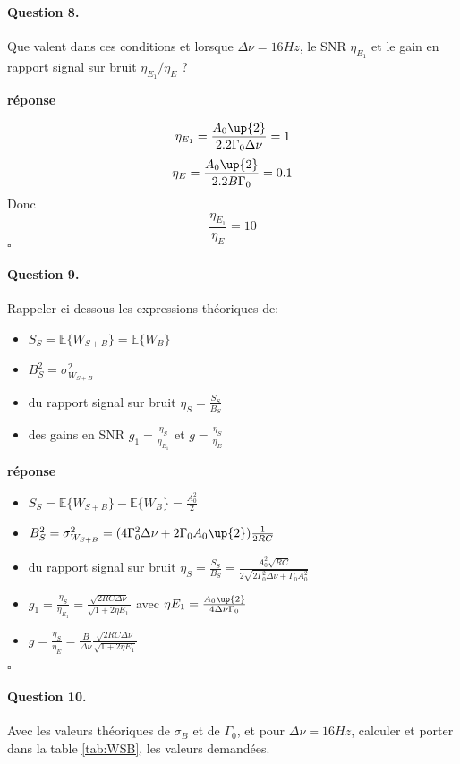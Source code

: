 \documentclass{article}
\newcommand{\dnu}{16}
\newcommand{\debutrep}[1]{\color{blue}\begin{center} \hrulefill \textbf{ #1 } \hrulefill \end{center} }
\newcommand{\finrep}{\vspace*{5mm}\hfill $\square$\color{black}\vspace*{5mm}}
\begin{document}
 \paragraph{Question 8.}
Que valent dans ces conditions et lorsque $\Delta\nu=\dnu Hz$, le SNR $\eta_{E_1}$ et le gain en rapport signal sur bruit $\eta_{E_1}/\eta_E$ ?

\debutrep{réponse}
$$
\eta_{E_1}=\frac{A_0\up{2}}{2.2\Gamma_0\Delta\nu}=1
$$
$$
\eta_E=\frac{A_0\up{2}}{2.2B\Gamma_0}=0.1
$$
Donc
$$ \frac{\eta_{E_1}}{\eta_E}=10
$$
\finrep

 \paragraph{Question 9.}
Rappeler ci-dessous les expressions théoriques de:\\
\begin{itemize}
\itemsep = 2mm
\item $S_S = \mathbb{E}\{W_{S+B}\} = \mathbb{E}\{W_{B}\} $
\item $B_S^2 = \sigma_{W_{S+B}}^2$
\item du rapport signal sur bruit $\eta_S = \frac{S_S}{B_S}$
\item des gains en SNR $g_1 =\frac{\eta_S}{\eta_{E_1}}$ et $g = \frac{\eta_S}{\eta_E}$
\end{itemize}

\debutrep{réponse}
\begin{itemize}
\itemsep = 2mm
\item $S_S = \mathbb{E}\{W_{S+B}\} - \mathbb{E}\{W_{B}\} = \frac{A_0 ^2}{2}$
\item $B_S^2 = \sigma_{W_{S+B}}^2 = (4\Gamma_0 ^{2}\Delta\nu+2\Gamma_0A_0\up{2})\frac{1}{2RC}$
\item du rapport signal sur bruit $\eta_S = \frac{S_S}{B_S} = \frac{A_0^2 \sqrt{RC}}{2\sqrt{2\Gamma_0^2\Delta \nu + \Gamma_0 A_0^2}}$
\item$g_1 =\frac{\eta_S}{\eta_{E_1}} = \frac{\sqrt{2RC\Delta \nu}}{\sqrt{1+2\eta E_1}}$ avec $\eta E_1 = \frac{A_0\up{2}}{4\Delta \nu \Gamma_0}$
\item $g = \frac{\eta_S}{\eta_E} = \frac{B}{\Delta \nu} \frac{\sqrt{2RC\Delta \nu}}{\sqrt{1+2\eta E_1}}$
\end{itemize}
\finrep

\paragraph{Question 10.}
Avec les valeurs théoriques de $\sigma_B$ et de $\Gamma_0$, et pour $\Delta\nu = \dnu Hz$, calculer et porter dans la table \ref{tab:WSB}, les valeurs demandées.
\end{document}
